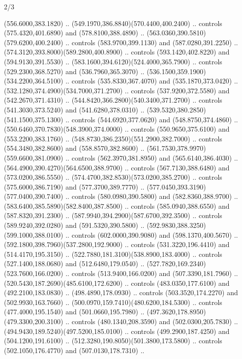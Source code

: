 \begin{flagdescription}{2/3}
\begin{scope}[xshift=0.5\flaglength,yshift=0.5\flagwidth,scale=\flagwidth/255]
\begin{scope}[y=-0.43pt, x=0.43pt,xshift=-193pt,yshift=133pt]
\begin{scope}[draw=black,line width=0.003\flagwidth]
  (556.6000,383.1820) .. (549.1970,386.8840)(570.4400,400.2400) .. controls
  (575.4320,401.6890) and (578.8100,388.4890) ..
  (563.0360,390.5810)(579.6200,400.2400) .. controls (583.9700,399.1130) and
  (587.0280,391.2250) .. (574.3120,393.8000)(589.2800,400.8900) .. controls
  (593.1420,402.8220) and (594.9130,391.5530) ..
  (583.1600,394.6120)(524.4000,365.7900) .. controls (529.2300,368.5270) and
  (536.7960,365.3070) .. (536.1500,359.1900)(534.2200,364.5100) .. controls
  (535.8330,367.4070) and (535.1870,373.0420) ..
  (532.1280,374.4900)(534.7000,371.2700) .. controls (537.9200,372.5580) and
  (542.2670,371.4310) .. (544.8420,366.2800)(540.3400,371.2700) .. controls
  (541.3030,373.5240) and (541.6280,378.0310) ..
  (539.5320,380.2850)(541.1500,375.1300) .. controls (544.6920,377.0620) and
  (548.8750,374.4860) .. (550.6460,370.7830)(548.3900,374.0000) .. controls
  (550.9650,375.6100) and (553.2200,383.1760) ..
  (548.8730,386.2350)(551.2900,382.7000) .. controls (554.3480,382.8600) and
  (558.8570,382.8600) .. (561.7530,378.9970)(559.6600,381.0900) .. controls
  (562.3970,381.8950) and (565.6140,386.4030) ..
  (564.4900,390.4270)(564.6500,388.9700) .. controls (567.7130,388.6480) and
  (573.0200,386.5550) .. (574.4700,382.8530)(573.0200,385.2700) .. controls
  (575.6000,386.7190) and (577.3700,389.7770) ..
  (577.0450,393.3190)(577.0400,390.7400) .. controls (580.0980,390.5800) and
  (582.8360,388.9700) .. (583.6400,385.5890)(582.8400,387.8500) .. controls
  (585.0940,388.6550) and (587.8320,391.2300) ..
  (587.9940,394.2900)(587.6700,392.3500) .. controls (589.9240,392.0280) and
  (591.5320,390.5800) .. (592.9830,388.3250)(599.1000,388.0100) .. controls
  (602.0000,390.9080) and (598.1370,400.5670) ..
  (592.1800,398.7960)(537.2800,192.9000) .. controls (531.3220,196.4410) and
  (514.4170,195.3150) .. (522.7880,181.3100)(538.8900,183.4000) .. controls
  (527.1400,188.0680) and (512.6480,179.0540) ..
  (527.7820,169.2340)(523.7600,166.0200) .. controls (513.9400,166.0200) and
  (507.3390,181.7960) .. (520.5430,187.2690)(485.6100,172.6200) .. controls
  (483.0350,177.6100) and (492.2100,183.0830) .. (498.4890,178.0930) .. controls
  (503.3520,174.2270) and (502.9930,163.7660) ..
  (500.0970,159.7410)(480.6200,184.5300) .. controls (477.4000,195.1540) and
  (501.0660,195.7980) .. (497.3620,178.8950)(479.3300,200.3100) .. controls
  (480.1340,208.3590) and (502.0300,205.7830) ..
  (494.9430,189.5240)(497.5200,185.0100) .. controls (499.2900,187.4250) and
  (504.1200,191.6100) .. (512.3280,190.8050)(501.3800,173.5800) .. controls
  (502.1050,176.4770) and (507.0130,178.7310) ..

\end{scope}
\end{scope}
\end{scope}
\end{flagdescription}
